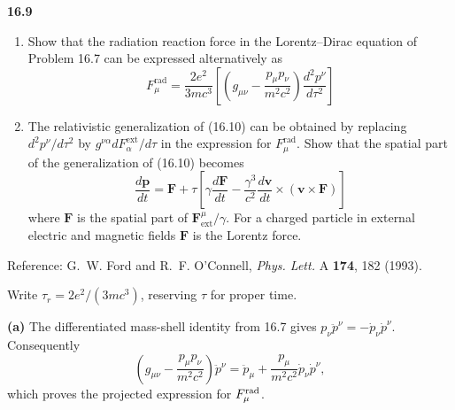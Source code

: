 \par\bigskip
\noindent\textbf{16.9}\quad\begin{enumerate}
\item[(a)] Show that the radiation reaction force in the Lorentz--Dirac equation of Problem 16.7 can be expressed alternatively as
\[
F_{\mu}^{\mathrm{rad}}=\frac{2e^{2}}{3mc^{3}}\left[\left(g_{\mu\nu}-\frac{p_{\mu}p_{\nu}}{m^{2}c^{2}}\right)\!\frac{d^{2}p^{\nu}}{d\tau^{2}}\right]
\]
\item[(b)] The relativistic generalization of (16.10) can be obtained by replacing $d^{2}p^{\nu}/d\tau^{2}$ by $g^{\nu\alpha}dF^{\mathrm{ext}}_{\alpha}/d\tau$ in the expression for $F_{\mu}^{\mathrm{rad}}$. Show that the spatial part of the generalization of (16.10) becomes
\[
\frac{d\mathbf{p}}{dt}=\mathbf{F}+\tau\left[\gamma\frac{d\mathbf{F}}{dt}-\frac{\gamma^{3}}{c^{2}}\frac{d\mathbf{v}}{dt}\times(\mathbf{v}\times\mathbf{F})\right]
\]
where $\mathbf{F}$ is the spatial part of $\mathbf{F}^{\mu}_{\mathrm{ext}}/\gamma$. For a charged particle in external electric and magnetic fields $\mathbf{F}$ is the Lorentz force.
\end{enumerate}
Reference: G.~W. Ford and R.~F. O'Connell, \emph{Phys. Lett.} A \textbf{174}, 182 (1993).
\solution

Write $\tau_r=2e^2/(3mc^3)$, reserving $\tau$ for proper time.

\textbf{(a)} The differentiated mass-shell identity from 16.7 gives
$p_\nu\ddot p^\nu=-\dot p_\nu\dot p^\nu$. Consequently
\[
\left(g_{\mu\nu}-\frac{p_\mu p_\nu}{m^2c^2}\right)\ddot p^\nu
=\ddot p_\mu+\frac{p_\mu}{m^2c^2}\dot p_\nu\dot p^\nu,
\]
which proves the projected expression for $F_\mu^{\rm rad}$.

